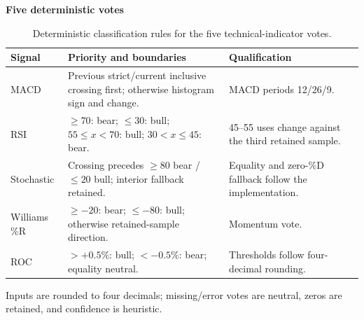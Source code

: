 \begin{table}[!htb]
\centering\small
\setlength{\tabcolsep}{3pt}
\renewcommand{\arraystretch}{1.15}
\caption{Deterministic classification rules for the five technical-indicator votes.}
\label{tab:indicator_rules}
\textbf{Five deterministic votes}\par\smallskip
\begin{tabular}{lp{7.1cm}p{5.2cm}}
\hline
Signal & Priority and boundaries & Qualification \\
\hline
MACD & Previous strict/current inclusive crossing first; otherwise histogram sign and change. & MACD periods 12/26/9. \\
RSI & $\ge70$: bear; $\le30$: bull; $55\le x<70$: bull; $30<x\le45$: bear. & 45--55 uses change against the third retained sample. \\
Stochastic & Crossing precedes $\ge80$ bear / $\le20$ bull; interior fallback retained. & Equality and zero-\%D fallback follow the implementation. \\
Williams \%R & $\ge-20$: bear; $\le-80$: bull; otherwise retained-sample direction. & Momentum vote. \\
ROC & $>+0.5\%$: bull; $<-0.5\%$: bear; equality neutral. & Thresholds follow four-decimal rounding. \\
\hline
\end{tabular}\par\medskip
\begin{minipage}{\textwidth}\footnotesize Inputs are rounded to four decimals; missing/error votes are neutral, zeros are retained, and confidence is heuristic.\end{minipage}
\end{table}

